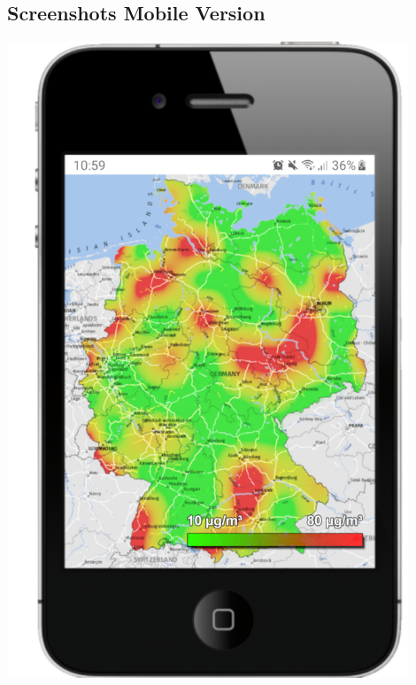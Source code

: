 \subsection{Screenshots Mobile Version}

\begin{center}
	\includegraphics[width=0.9\textwidth]{media/Startseite-Mobile-Version} 


\end{center}
